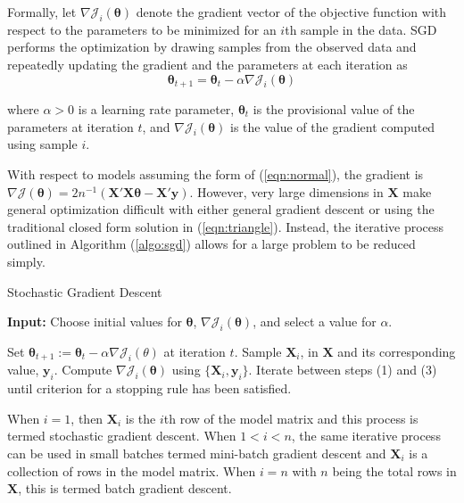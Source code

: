 \documentclass[12pt]{article}
\begin{document}
Formally, let $\nabla\mathcal{J}_i(\bm{\theta})$ denote the gradient vector of the objective function with respect to the parameters to be minimized for an $i$th sample in the data. SGD performs the optimization by drawing samples from the observed data and repeatedly updating the gradient and the parameters at each iteration as
\begin{equation}
\label{eqn:sgd}
\bm{\theta}_{t+1} = \bm{\theta}_t - \alpha \nabla\mathcal{J}_i(\bm{\theta})
\end{equation}

\noindent where $\alpha > 0$ is a learning rate parameter, $\bm{\theta}_t$ is the provisional value of the parameters at iteration $t$, and $\nabla\mathcal{J}_i(\bm{\theta})$ is the value of the gradient computed using sample $i$. 

With respect to models assuming the form of (\ref{eqn:normal}), the gradient is $\nabla\mathcal{J}(\bm{\theta}) = 2n^{-1}(\bm{X}'\bm{X}\bm{\theta}-\bm{X}'\bm{y})$. However, very large dimensions in $\bm{X}$ make general optimization difficult with either general gradient descent or using the traditional closed form solution in (\ref{eqn:triangle}). Instead, the iterative process outlined in Algorithm (\ref{algo:sgd}) allows for a large problem to be reduced simply. 

\begin{algorithm}
\caption{Stochastic Gradient Descent}
\label{algo:sgd}
	\hspace*{\algorithmicindent} \textbf{Input:} Choose initial values for $\bm{\theta}$, $\nabla\mathcal{J}_i(\bm{\theta})$, and select a value for $\alpha$.
\begin{algorithmic}[1]
	\State Set $\bm{\theta}_{t+1}:= \bm{\theta}_t - \alpha\nabla\mathcal{J}_i(\theta)$ at iteration $t$.
	\State Sample $\bm{X}_i$, in $\bm{X}$ and its corresponding value, $\bm{y}_i$.
	\State Compute $\nabla\mathcal{J}_i(\bm{\theta})$ using $\{\bm{X}_i, \bm{y}_i\}$.
	\State Iterate between steps (1) and (3) until criterion for a stopping rule has been satisfied. 
\end{algorithmic}
\end{algorithm}

When $i=1$, then $\bm{X}_i$ is the $i$th row of the model matrix and this process is termed stochastic gradient descent. When $1 < i < n$, the same iterative process can be used in small batches termed mini-batch gradient descent and $\bm{X}_i$ is a collection of rows in the model matrix. When $i=n$ with $n$ being the total rows in $\bm{X}$, this is termed batch gradient descent. 
\end{document}
